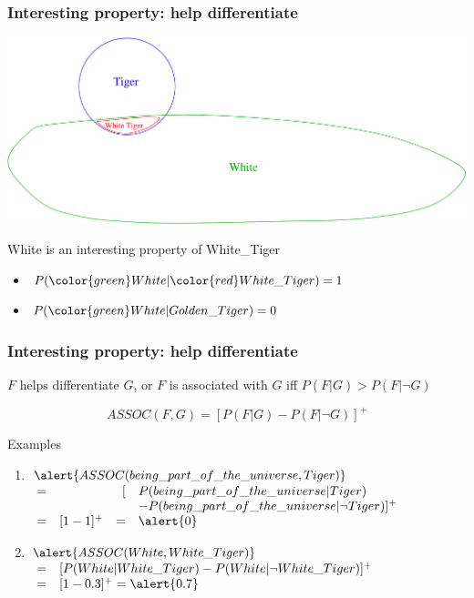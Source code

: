 \documentclass{beamer}
\begin{document}
\frame
{
  \frametitle{Interesting property: help \alert{differentiate}}

  \includegraphics[scale=0.32]{white_tiger.pdf}

  \begin{beamerboxesrounded}{White is an
      \alert{interesting property} of White\_Tiger}
    \begin{itemize}
    \item $P({\color{green}White}|{\color{red}White\_Tiger})=1$
    \item $P({\color{green}White}|Golden\_Tiger)=0$
    \end{itemize}
  \end{beamerboxesrounded}
 
}

\frame
{
  \frametitle{Interesting property: help \alert{differentiate}}

  \begin{beamerboxesrounded}{$F$ helps \alert{differentiate} $G$,
      or $F$ is \alert{associated} with $G$ iff}
    $P(F|G) > P(F|\lnot G)$
  \end{beamerboxesrounded}
  
  \[ASSOC(F,G) = [P(F|G)-P(F|\lnot G)]^+\]

  \pause

  Examples
  \begin{enumerate}
  \item<+-> 
    $\alert{ASSOC(being\_part\_of\_the\_universe, Tiger)}$\\
    $
    \begin{array}{clrl}
      = & & [ & P(being\_part\_of\_the\_universe|Tiger)\\
      & &  & - P(being\_part\_of\_the\_universe|\lnot Tiger)]^+\\
      = & [1-1]^+ & = & \alert{0}\\
    \end{array}
    $
  \item<+->
    $\alert{ASSOC(White,White\_Tiger)}$\\
    $
    \begin{array}{cl}
      = & [ P(White|White\_Tiger) - P(White|\lnot White\_Tiger)]^+\\
      = & [ 1 - 0.3 ]^+ = \alert{0.7}
    \end{array}
    $
  \end{enumerate}

}
\end{document}
